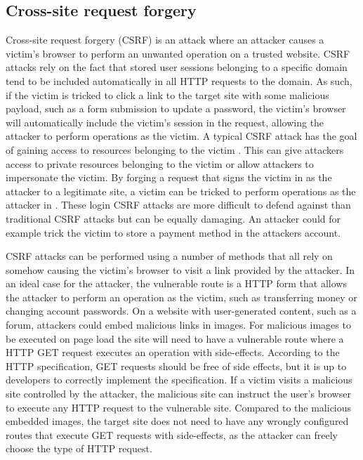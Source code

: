 \subsection{Cross-site request forgery}
Cross-site request forgery (CSRF) is an attack where an attacker causes a victim's browser to perform an unwanted operation on a trusted website.
CSRF attacks rely on the fact that stored user sessions belonging to a specific domain tend to be included automatically in all HTTP requests to the domain.
As such, if the victim is tricked to click a link to the target site with some malicious payload, such as a form submission to update a password, the victim's browser will automatically include the victim's session in the request, allowing the attacker to perform operations as the victim.
A typical CSRF attack has the goal of gaining access to resources belonging to the victim \citep{lin_threat_2009}.
This can give attackers access to private resources belonging to the victim or allow attackers to impersonate the victim.
By forging a request that signs the victim in as the attacker to a legitimate site, a victim can be tricked to perform operations as the attacker in \citep{barth_robust_2008}.
These login CSRF attacks are more difficult to defend against than traditional CSRF attacks but can be equally damaging.
An attacker could for example trick the victim to store a payment method in the attackers account.

CSRF attacks can be performed using a number of methods that all rely on somehow causing the victim's browser to visit a link provided by the attacker.
In an ideal case for the attacker, the vulnerable route is a HTTP form that allows the attacker to perform an operation as the victim, such as transferring money or changing account passwords.
On a website with user-generated content, such as a forum, attackers could embed malicious links in images.
For malicious images to be executed on page load the site will need to have a vulnerable route where a HTTP GET request executes an operation with side-effects.
According to the HTTP specification, GET requests should be free of side effects, but it is up to developers to correctly implement the specification.
If a victim visits a malicious site controlled by the attacker, the malicious site can instruct the user's browser to execute any HTTP request to the vulnerable site.
Compared to the malicious embedded images, the target site does not need to have any wrongly configured routes that execute GET requests with side-effects, as the attacker can freely choose the type of HTTP request.

